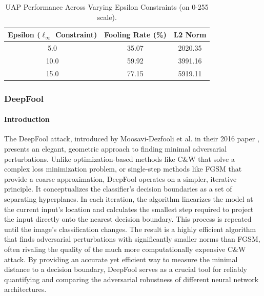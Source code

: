 \documentclass[../main.tex]{subfiles}
\begin{document}
\begin{table}[H]
    \centering
    \caption{UAP Performance Across Varying Epsilon Constraints (on 0-255 scale).}
    \label{tab:uap_multi_epsilon_results}
    \begin{tabular}{@{\hspace{0.3cm}}ccc@{\hspace{0.3cm}}}
    \toprule
    \textbf{Epsilon ($\ell_\infty$ Constraint)} & \textbf{Fooling Rate (\%)} & \textbf{L2 Norm} \\
    \midrule
     5.0 & 35.07 & 2020.35 \\
    10.0 & 59.92 & 3991.16 \\
    15.0 & 77.15 & 5919.11 \\
    \bottomrule
    \end{tabular}
\end{table}
\clearpage

\subsubsection{DeepFool}

\paragraph{Introduction}
The DeepFool attack, introduced by Moosavi-Dezfooli et al. in their 2016 paper \cite{moosavidezfooli2016deepfoolsimpleaccuratemethod}, presents an elegant, geometric approach to finding minimal adversarial perturbations. Unlike optimization-based methods like C\&W that solve a complex loss minimization problem, or single-step methods like FGSM that provide a coarse approximation, DeepFool operates on a simpler, iterative principle. It conceptualizes the classifier's decision boundaries as a set of separating hyperplanes. In each iteration, the algorithm linearizes the model at the current input's location and calculates the smallest step required to project the input directly onto the nearest decision boundary. This process is repeated until the image's classification changes. The result is a highly efficient algorithm that finds adversarial perturbations with significantly smaller norms than FGSM, often rivaling the quality of the much more computationally expensive C\&W attack. By providing an accurate yet efficient way to measure the minimal distance to a decision boundary, DeepFool serves as a crucial tool for reliably quantifying and comparing the adversarial robustness of different neural network architectures.
\end{document}
